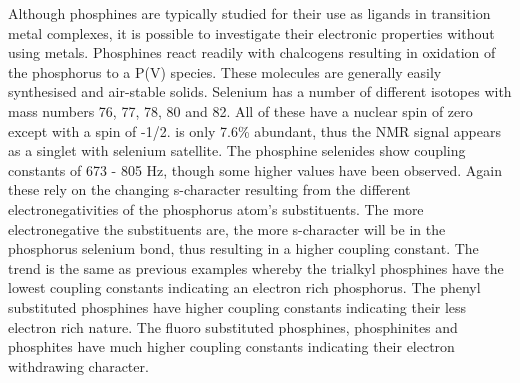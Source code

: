 Although phosphines are typically studied for their use as ligands in transition metal complexes, it is possible to investigate their electronic properties without using metals.  Phosphines react readily with chalcogens resulting in oxidation of the phosphorus to a P(V) species.  These molecules are generally easily synthesised and air-stable solids.  Selenium has a number of different isotopes with mass numbers 76, 77, 78, 80 and 82.  All of these have a nuclear spin of zero except  with a spin of -1/2.   is only 7.6\% abundant, thus the \phosphorus{} \gls{NMR} signal appears as a singlet with selenium satellite.  The phosphine selenides show coupling constants of 673 - 805 Hz, though some higher values have been observed.  Again these rely on the changing s-character resulting from the different electronegativities of the phosphorus atom's substituents.  The more electronegative the substituents are, the more s-character will be in the phosphorus selenium bond, thus resulting in a higher coupling constant.  The trend is the same as previous examples whereby the trialkyl phosphines have the lowest coupling constants indicating an electron rich phosphorus.  The phenyl substituted phosphines have higher coupling constants indicating their less electron rich nature.  The fluoro substituted phosphines, phosphinites and phosphites have much higher coupling constants indicating their electron withdrawing character.  

